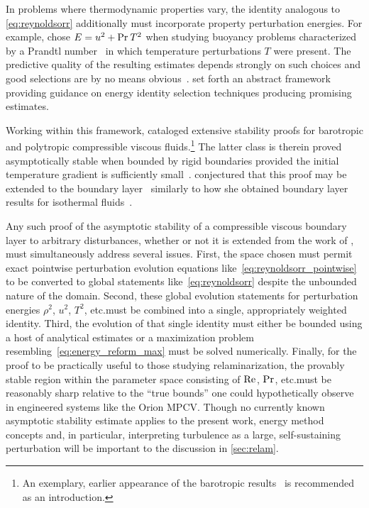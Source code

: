 In problems where thermodynamic properties vary, the identity analogous to
\eqref{eq:reynoldsorr} additionally must incorporate property perturbation
energies.  For example, \citeauthor{Joseph1966Nonlinear} chose $E = u^2 +
\mbox{Pr}_{}{}\,T^2$ when studying buoyancy problems characterized by a Prandtl
number~\Prandtl{} in which temperature perturbations $T$ were present.  The predictive
quality of the resulting estimates depends strongly on such choices and good
selections are by no means obvious~\citep{Galdi1985Nonlinear}.
\citet{Galdi1990New} set forth an abstract framework providing guidance on
energy identity selection techniques producing promising estimates.

Working within this framework, \citet{Padula2011Asymptotic} cataloged extensive
stability proofs for barotropic and polytropic compressible viscous
fluids.\footnote{%
An exemplary, earlier appearance of the barotropic
results~\citep{Padula2000Stability} is recommended as an introduction.
}
The latter class is therein proved asymptotically stable when bounded by rigid
boundaries provided the initial temperature gradient is sufficiently
small~\citep[theorem~2.4.20]{Padula2011Asymptotic}.
\citeauthor{Padula2011Asymptotic} conjectured that this proof may be extended
to the boundary layer~\citep[page 207]{Padula2011Asymptotic} similarly to how
she obtained boundary layer results for isothermal
fluids~\citep[\textsection\textsection{}2.4.1--2,
\textsection{}4]{Padula2011Asymptotic}.

Any such proof of the asymptotic stability of a compressible viscous boundary
layer to arbitrary disturbances, whether or not it is extended from the work of
\citeauthor{Padula2011Asymptotic}, must simultaneously address several issues.
First, the space chosen must permit exact pointwise perturbation evolution
equations like~\eqref{eq:reynoldsorr_pointwise} to be converted to global
statements like~\eqref{eq:reynoldsorr} despite the unbounded nature of the
domain.  Second, these global evolution statements for perturbation energies
$\rho^2$, $u^2$, $T^2$, etc.\@ must be combined into a single, appropriately
weighted identity.  Third, the evolution of that single identity must either be
bounded using a host of analytical estimates or a
maximization problem resembling~\eqref{eq:energy_reform_max} must be solved
numerically.
Finally, for the proof to be practically useful to those studying
relaminarization, the provably stable region within the parameter space
consisting of $\mbox{Re}_{}$, $\mbox{Pr}_{}$, etc.\@ must be reasonably sharp relative
to the ``true bounds'' one could hypothetically observe in engineered systems
like the Orion MPCV.
%
Though no currently known asymptotic stability estimate applies to the present
work, energy method concepts and, in particular, interpreting turbulence as a
large, self-sustaining perturbation will be important to the discussion in
\autoref{sec:relam}.

